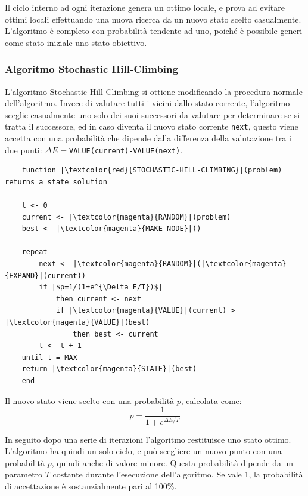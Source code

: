 \documentclass{article}
\numberwithin{equation}{subsection}
\begin{document}
Il ciclo interno ad ogni iterazione genera un ottimo locale, e prova ad evitare ottimi locali effettuando una nuova ricerca da un nuovo stato scelto 
casualmente. L'algoritmo è completo con probabilità tendente ad uno, poiché è possibile generi come stato 
iniziale uno stato obiettivo. 

\subsubsection{Algoritmo Stochastic Hill-Climbing}

L'algoritmo Stochastic Hill-Climbing si ottiene modificando la procedura normale dell'algoritmo. Invece di valutare tutti i vicini dallo stato corrente, l'algoritmo 
sceglie casualmente uno solo dei suoi successori da valutare per determinare se si tratta il successore, ed in caso diventa il nuovo stato corrente \verb|next|, questo 
viene accetta con una probabilità che dipende dalla differenza della valutazione tra i due punti: $\Delta E=$\verb|VALUE(current)-VALUE(next)|. 

\begin{verbatim}
    function |\textcolor{red}{STOCHASTIC-HILL-CLIMBING}|(problem) returns a state solution

    t <- 0
    current <- |\textcolor{magenta}{RANDOM}|(problem)
    best <- |\textcolor{magenta}{MAKE-NODE}|()

    repeat
        next <- |\textcolor{magenta}{RANDOM}|(|\textcolor{magenta}{EXPAND}|(current))
        if |$p=1/(1+e^{\Delta E/T})$| 
            then current <- next
            if |\textcolor{magenta}{VALUE}|(current) > |\textcolor{magenta}{VALUE}|(best)   
                then best <- current
        t <- t + 1
    until t = MAX
    return |\textcolor{magenta}{STATE}|(best)
    end
\end{verbatim}



Il nuovo stato viene scelto con una probabilità $p$, calcolata come:
\begin{equation}
    p=\displaystyle\frac{1}{1+e^{\Delta E/T}}
\end{equation}

In seguito dopo una serie di iterazioni l'algoritmo restituisce uno stato ottimo. L'algoritmo ha quindi un solo ciclo, e può scegliere un nuovo punto con una probabilità 
$p$, quindi anche di valore minore. Questa probabilità dipende da un parametro $T$ costante durante l'esecuzione dell'algoritmo. Se vale 1, la probabilità di 
accettazione è sostanzialmente pari al 100\%. 
\end{document}
